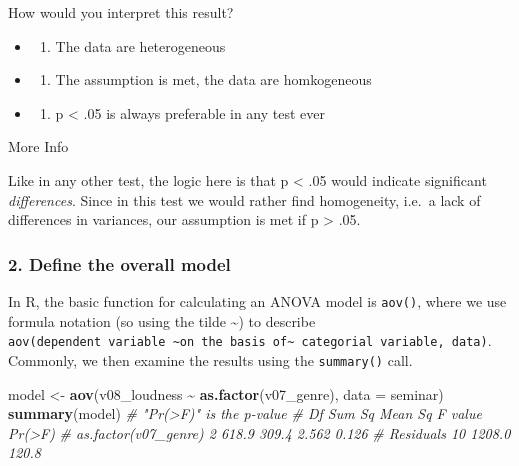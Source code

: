 \documentclass[
]{book}
\newenvironment{Shaded}{\begin{snugshade}}{\end{snugshade}}
\newcommand{\AttributeTok}[1]{\textcolor[rgb]{0.13,0.29,0.53}{#1}}
\newcommand{\CommentTok}[1]{\textcolor[rgb]{0.56,0.35,0.01}{\textit{#1}}}
\newcommand{\FunctionTok}[1]{\textcolor[rgb]{0.13,0.29,0.53}{\textbf{#1}}}
\newcommand{\NormalTok}[1]{#1}
\newcommand{\OtherTok}[1]{\textcolor[rgb]{0.56,0.35,0.01}{#1}}
\newcommand{\SpecialCharTok}[1]{\textcolor[rgb]{0.81,0.36,0.00}{\textbf{#1}}}
\providecommand{\tightlist}{%
  \setlength{\itemsep}{0pt}\setlength{\parskip}{0pt}}
\begin{document}
How would you interpret this result?

\begin{itemize}
\tightlist
\item
  \begin{enumerate}
  \def\labelenumi{(\Alph{enumi})}
  \tightlist
  \item
    The data are heterogeneous\\
  \end{enumerate}
\item
  \begin{enumerate}
  \def\labelenumi{(\Alph{enumi})}
  \setcounter{enumi}{1}
  \tightlist
  \item
    The assumption is met, the data are homkogeneous\\
  \end{enumerate}
\item
  \begin{enumerate}
  \def\labelenumi{(\Alph{enumi})}
  \setcounter{enumi}{2}
  \tightlist
  \item
    p \textless{} .05 is always preferable in any test ever
  \end{enumerate}
\end{itemize}

More Info

Like in any other test, the logic here is that p \textless{} .05 would indicate significant \emph{differences}.
Since in this test we would rather find homogeneity, i.e.~a lack of differences in variances, our assumption is met if p \textgreater{} .05.

\subsubsection*{2. Define the overall model}\label{define-the-overall-model}

In R, the basic function for calculating an ANOVA model is \texttt{aov()}, where we use formula notation (so using the tilde \textasciitilde) to describe \texttt{aov(dependent\ variable\ \textasciitilde{}on\ the\ basis\ of\textasciitilde{}\ categorial\ variable,\ data)}.
Commonly, we then examine the results using the \texttt{summary()} call.

\begin{Shaded}
\begin{Highlighting}[]
\NormalTok{model }\OtherTok{\textless{}{-}} \FunctionTok{aov}\NormalTok{(v08\_loudness }\SpecialCharTok{\textasciitilde{}} \FunctionTok{as.factor}\NormalTok{(v07\_genre), }\AttributeTok{data =}\NormalTok{ seminar)}
\FunctionTok{summary}\NormalTok{(model) }\CommentTok{\# "Pr(\textgreater{}F)" is the p{-}value}
\CommentTok{\#                      Df Sum Sq Mean Sq F value Pr(\textgreater{}F)}
\CommentTok{\# as.factor(v07\_genre)  2  618.9   309.4   2.562  0.126}
\CommentTok{\# Residuals            10 1208.0   120.8}
\end{Highlighting}
\end{Shaded}
\end{document}
